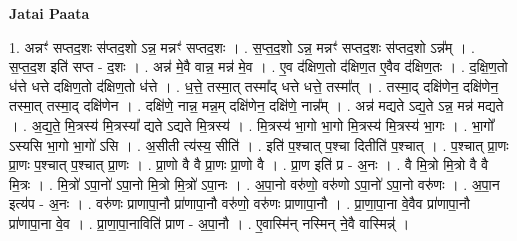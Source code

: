\documentclass[17pt]{extarticle}
\begin{document}
\textbf{Jatai Paata} \newline

1. अन्नꣳ॑ सप्तद॒शः स॑प्तद॒शो ऽन्न॒ मन्नꣳ॑ सप्तद॒शः । . स॒प्त॒द॒शो ऽन्न॒ मन्नꣳ॑ सप्तद॒शः स॑प्तद॒शो ऽन्न᳚म् । . स॒प्त॒द॒श इति॑ सप्त - द॒शः । . अन्न॑ मे॒वै वान्न॒ मन्न॑ मे॒व । . ए॒व द॑क्षिण॒तो द॑क्षिण॒त ए॒वैव द॑क्षिण॒तः । . द॒क्षि॒ण॒तो ध॑त्ते धत्ते दक्षिण॒तो द॑क्षिण॒तो ध॑त्ते । . ध॒त्ते॒ तस्मा॒त् तस्मा᳚द् धत्ते धत्ते॒ तस्मा᳚त् । . तस्मा॒द् दक्षि॑णेन॒ दक्षि॑णेन॒ तस्मा॒त् तस्मा॒द् दक्षि॑णेन । . दक्षि॑णे॒ नान्न॒ मन्न॒म् दक्षि॑णेन॒ दक्षि॑णे॒ नान्न᳚म् । . अन्न॑ मद्यते ऽद्य॒ते ऽन्न॒ मन्न॑ मद्यते । . अ॒द्य॒ते॒ मि॒त्रस्य॑ मि॒त्रस्या᳚ द्यते ऽद्यते मि॒त्रस्य॑ । . मि॒त्रस्य॑ भा॒गो भा॒गो मि॒त्रस्य॑ मि॒त्रस्य॑ भा॒गः । . भा॒गो᳚ ऽस्यसि भा॒गो भा॒गो॑ ऽसि । . अ॒सीती त्य॑स्य॒ सीति॑ । . इति॑ प॒श्चात् प॒श्चा दितीति॑ प॒श्चात् । . प॒श्चात् प्रा॒णः प्रा॒णः प॒श्चात् प॒श्चात् प्रा॒णः । . प्रा॒णो वै वै प्रा॒णः प्रा॒णो वै । . प्रा॒ण इति॑ प्र - अ॒नः । . वै मि॒त्रो मि॒त्रो वै वै मि॒त्रः । . मि॒त्रो॑ ऽपा॒नो॑ ऽपा॒नो मि॒त्रो मि॒त्रो॑ ऽपा॒नः । . अ॒पा॒नो वरु॑णो॒ वरु॑णो ऽपा॒नो॑ ऽपा॒नो वरु॑णः । . अ॒पा॒न इत्य॑प - अ॒नः । . वरु॑णः प्राणापा॒नौ प्रा॑णापा॒नौ वरु॑णो॒ वरु॑णः प्राणापा॒नौ । . प्रा॒णा॒पा॒ना वे॒वैव प्रा॑णापा॒नौ प्रा॑णापा॒ना वे॒व । . प्रा॒णा॒पा॒नाविति॑ प्राण - अ॒पा॒नौ । . ए॒वास्मि॑न् नस्मिन् ने॒वै वास्मिन्न्॑ । \newline
\end{document}
